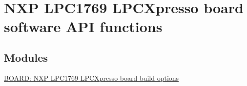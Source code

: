 \hypertarget{group___b_o_a_r_d___n_x_p___l_p_c_x_p_r_e_s_s_o__1769}{\section{N\+X\+P L\+P\+C1769 L\+P\+C\+Xpresso board software A\+P\+I functions}
\label{group___b_o_a_r_d___n_x_p___l_p_c_x_p_r_e_s_s_o__1769}
}
\subsection*{Modules}
\begin{DoxyCompactItemize}
\item 
\hyperlink{group___b_o_a_r_d___n_x_p___l_p_c_x_p_r_e_s_s_o__1769___o_p_t_i_o_n_s}{B\+O\+A\+R\+D\+: N\+X\+P L\+P\+C1769 L\+P\+C\+Xpresso board build options}
\end{DoxyCompactItemize}
